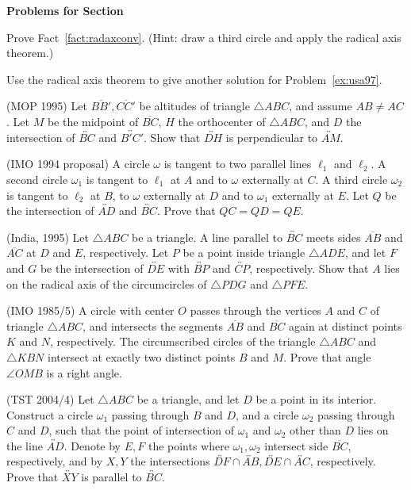 \documentclass[12pt]{book}
\newcounter{exc}
\numberwithin{exc}{section}
\numberwithin{figure}{section}
\newenvironment{exer}{\vspace{0.1in}
\noindent \textbf{Problems for Section~\thesection} \vspace{0.1in}
\begin{list}{\arabic{exc}.}{\usecounter{exc}}}{\end{list}}
\numberwithin{equation}{theorem}
\def\ii{\item}
\def\line#1{\overleftrightarrow{#1}}
\def\seg#1{\overline{#1}}
\begin{document}
\begin{exer}
\ii \label{ex:radaxconv}
Prove Fact~\ref{fact:radaxconv}. (Hint: draw a third circle and
apply the radical axis theorem.)

\ii
Use the radical axis theorem to give another solution for 
Problem~\ref{ex:usa97}.

\ii (MOP 1995)
Let $\seg{BB'}, \seg{CC'}$ 
be altitudes of triangle $\triangle ABC$, and assume $AB \neq
AC$. Let $M$ be the midpoint of $\seg{BC}$, $H$ the orthocenter of 
$\triangle ABC$,
and $D$ the intersection of $\line{BC}$ and $\line{B'C'}$. Show that 
$\line{DH}$ is
perpendicular to $\line{AM}$.

\ii
(IMO 1994 proposal) %
A circle $\omega$ is tangent to two parallel lines $\ell_{1}$ and 
$\ell_{2}$. A second circle $\omega_{1}$ is tangent to $\ell_{1}$ at 
$A$ and to $\omega$ externally at $C$. A third circle $\omega_{2}$ is 
tangent to $\ell_{2}$ at $B$, to $\omega$ externally at $D$ and to 
$\omega_{1}$ externally at $E$. Let $Q$ be the intersection of $\line{AD}$ 
and $\line{BC}$. Prove that $QC = QD = QE$.

\ii
(India, 1995)
Let $\triangle
ABC$ be a triangle. A line parallel to $\line{BC}$ meets sides 
$\seg{AB}$ and $\seg{AC}$ 
at $D$ and $E$, respectively. Let $P$ be a point inside triangle 
$\triangle ADE$, and let $F$ and $G$ be the intersection of $\line{DE}$ 
with $\line{BP}$ and 
$\line{CP}$, respectively. Show that $A$ lies on the radical axis of the 
circumcircles of $\triangle PDG$ and $\triangle PFE$.

\ii \label{ex:imo85}
(IMO 1985/5)
A circle with center $O$ passes through the vertices $A$ and $C$ of 
triangle $\triangle
ABC$, and intersects the segments $\seg{AB}$ and $\seg{BC}$ again at 
distinct points $K$ and $N$, respectively. The circumscribed circles 
of the triangle $\triangle ABC$ and $\triangle
KBN$ intersect at exactly two distinct 
points $B$ and $M$. Prove that angle $\angle OMB$ is a right angle. 

\ii \label{ex:tst04}
(TST 2004/4)
Let $\triangle ABC$ be a triangle, and let
$D$ be a point in its interior. Construct a circle $\omega_1$
passing through $B$ and $D$, and a circle $\omega_2$ passing through
$C$ and $D$, such that the point of intersection of $\omega_1$ and
$\omega_2$ other than $D$ lies on the line $\line{AD}$. Denote by
$E, F$ the points where $\omega_1, \omega_2$ intersect side
$\seg{BC}$, respectively, and by $X, Y$ the intersections
$\line{DF} \cap \line{AB}, \line{DE} \cap \line{AC}$, respectively.
Prove that $\line{XY}$ is parallel to $\line{BC}$.
\end{exer}
\end{document}

